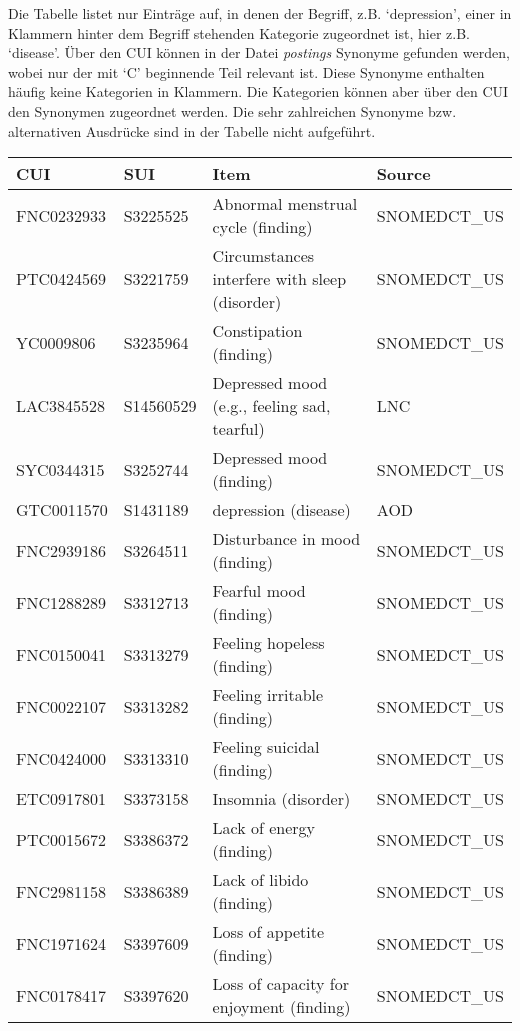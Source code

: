 Die Tabelle listet nur Einträge auf, in denen der Begriff, z.B. `depression', einer in Klammern hinter dem Begriff stehenden Kategorie zugeordnet ist, hier z.B. `disease'. Über den CUI können in der Datei \emph{postings} Synonyme gefunden werden, wobei nur der mit `C' beginnende Teil relevant ist. Diese Synonyme enthalten häufig keine Kategorien in Klammern. Die Kategorien können aber über den CUI den Synonymen zugeordnet werden. Die sehr zahlreichen Synonyme bzw. alternativen Ausdrücke sind in der Tabelle nicht aufgeführt.

\begin{center}
\begin{tabular}{llll}
\hline
\textbf{CUI}	& \textbf{SUI}	& \textbf{Item} & \textbf{Source} \\
\hline
FNC0232933 &	S3225525 & \parbox[t]{5cm}{Abnormal menstrual cycle (finding)} &	SNOMEDCT\_US \\
PTC0424569 &	S3221759 & \parbox[t]{5cm}{Circumstances interfere with sleep (disorder)} &	SNOMEDCT\_US \\
YC0009806 & S3235964 & Constipation (finding) &	SNOMEDCT\_US \\
LAC3845528 &	S14560529 &\parbox[t]{5cm}{Depressed mood (e.g., feeling sad, tearful)} & LNC \\
SYC0344315 &	S3252744 &	Depressed mood (finding) &	SNOMEDCT\_US \\
GTC0011570 &	S1431189 &	depression (disease) & AOD \\
FNC2939186 &	S3264511 &	Disturbance in mood (finding) & SNOMEDCT\_US \\
FNC1288289 &	S3312713 &	Fearful mood (finding) & SNOMEDCT\_US \\
FNC0150041 &	S3313279 &	Feeling hopeless (finding) &	SNOMEDCT\_US \\
FNC0022107 &	S3313282 &	Feeling irritable (finding)	 & SNOMEDCT\_US \\
FNC0424000 &	S3313310 &	Feeling suicidal (finding) &	SNOMEDCT\_US \\
ETC0917801 &	S3373158 &	Insomnia (disorder) &	SNOMEDCT\_US \\
PTC0015672 &	S3386372 &	Lack of energy (finding) &	SNOMEDCT\_US \\
FNC2981158 &	S3386389 &	Lack of libido (finding) & SNOMEDCT\_US \\
FNC1971624 &	S3397609 &	Loss of appetite (finding) & SNOMEDCT\_US \\
FNC0178417 &	S3397620 &	\parbox[t]{5cm}{Loss of capacity for enjoyment (finding)} & SNOMEDCT\_US \\

\end{tabular}
\end{center}
